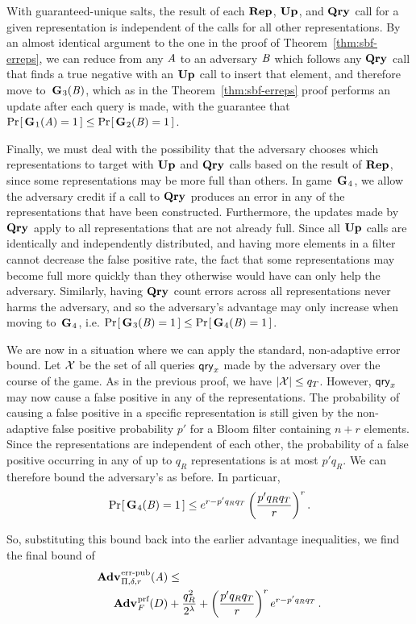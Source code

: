 With guaranteed-unique salts, the result of each $\textup{\textbf{Rep}}\hspace{0.5pt}$, $\textup{\textbf{Up}}\hspace{0.5pt}$, and $\textup{\textbf{Qry}}\hspace{0.5pt}$
call for a given representation is independent of the calls for all other
representations. By an almost identical argument to the one in the proof of
Theorem~\ref{thm:sbf-erreps}, we can reduce from any $\mathit{A}$ to an adversary
$\mathit{B}$ which follows any $\textup{\textbf{Qry}}\hspace{0.5pt}$ call that finds a true negative with an
$\textup{\textbf{Up}}\hspace{0.5pt}$ call to insert that element, and therefore move to~$\textup{\textbf{G}}\hspace{0.5pt}_3(\mathit{B})$,
which as in the Theorem~\ref{thm:sbf-erreps} proof performs an update after each
query is made, with the guarantee that $\Pr\hspace{-1pt}\left[\,\textup{\textbf{G}}\hspace{0.5pt}_1(\mathit{A}) = 1\,\right] \le
\Pr\hspace{-1pt}\left[\,\textup{\textbf{G}}\hspace{0.5pt}_2(\mathit{B}) = 1\,\right]$.

Finally, we must deal with the possibility that the adversary chooses which
representations to target with $\textup{\textbf{Up}}\hspace{0.5pt}$ and $\textup{\textbf{Qry}}\hspace{0.5pt}$ calls based on the result of
$\textup{\textbf{Rep}}\hspace{0.5pt}$, since some representations may be more full than others. In
game~$\textup{\textbf{G}}\hspace{0.5pt}_4$, we allow the adversary credit if a call to
$\textup{\textbf{Qry}}\hspace{0.5pt}$ produces an error in any of the representations that have been
constructed. Furthermore, the updates made by $\textup{\textbf{Qry}}\hspace{0.5pt}$ apply to all
representations that are not already full. Since all $\textup{\textbf{Up}}\hspace{0.5pt}$ calls are
identically and independently distributed, and having more elements in a filter
cannot decrease the false positive rate, the fact that some representations may
become full more quickly than they otherwise would have can only help the
adversary. Similarly, having $\textup{\textbf{Qry}}\hspace{0.5pt}$ count errors across all representations
never harms the adversary, and so the adversary's advantage may only increase
when moving to~$\textup{\textbf{G}}\hspace{0.5pt}_4$,
i.e. $\Pr\hspace{-1pt}\left[\,\textup{\textbf{G}}\hspace{0.5pt}_3(\mathit{B}) = 1\,\right] \le \Pr\hspace{-1pt}\left[\,\textup{\textbf{G}}\hspace{0.5pt}_4(\mathit{B}) = 1\,\right]$.

We are now in a situation where we can apply the standard, non-adaptive error
bound. Let $\mathcal{X}$ be the set of all queries $\mathsf{qry}_x$ made by the adversary over
the course of the game. As in the previous proof, we have $|\mathcal{X}| \le q_T$.
However, $\mathsf{qry}_x$ may now cause a false positive in any of the representations.
The probability of causing a false positive in a specific representation is
still given by the non-adaptive false positive probability $p'$ for a Bloom
filter containing $n+r$ elements. Since the representations are independent of
each other, the probability of a false positive occurring in any of up to $q_R$
representations is at most $p'q_R$. We can therefore bound the adversary's
as before. In particuar,
\begin{equation}
   \Pr\hspace{-1pt}\left[\,\textup{\textbf{G}}\hspace{0.5pt}_4(\mathit{B})=1\,\right] \le
     e^{r-p'q_Rq_T}\left(\frac{p'q_Rq_T}{r}\right)^r.
\end{equation}

So, substituting this bound back into the earlier advantage inequalities, we find the final bound of
\begin{equation*}
  \begin{aligned}
    \Adv{\errep}_{\Pi,\delta,r}(\advA) &\leq \\
      \Adv{\prf}_F(D) &  +
    \frac{q_R^2}{2^\lambda} +
    \left(\frac{p'q_Rq_T}{r}\right)^re^{r-p'q_Rq_T} \,.
  \end{aligned}
\end{equation*}
